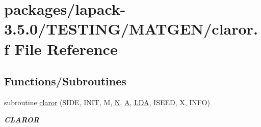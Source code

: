 \hypertarget{claror_8f}{}\section{packages/lapack-\/3.5.0/\+T\+E\+S\+T\+I\+N\+G/\+M\+A\+T\+G\+E\+N/claror.f File Reference}
\label{claror_8f}
\subsection*{Functions/\+Subroutines}
\begin{DoxyCompactItemize}
\item 
subroutine \hyperlink{group__complex__matgen_ga463c7fe8bfbf095b0c8703935e2b619a}{claror} (S\+I\+D\+E, I\+N\+I\+T, M, \hyperlink{polmisc_8c_a0240ac851181b84ac374872dc5434ee4}{N}, \hyperlink{classA}{A}, \hyperlink{example__user_8c_ae946da542ce0db94dced19b2ecefd1aa}{L\+D\+A}, I\+S\+E\+E\+D, X, I\+N\+F\+O)
\begin{DoxyCompactList}\small\item\em {\bfseries C\+L\+A\+R\+O\+R} \end{DoxyCompactList}\end{DoxyCompactItemize}
